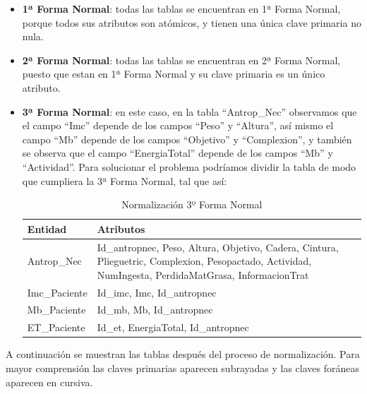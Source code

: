 \begin{itemize}
\item \textbf{1ª Forma Normal}: todas las tablas se encuentran en 1ª Forma Normal, porque todos sus atributos son atómicos, y tienen una única clave primaria no nula.
\item \textbf{2ª Forma Normal}: todas las tablas se encuentran en 2ª Forma Normal, puesto que estan en 1ª Forma Normal y su clave primaria es un único atributo.
\item \textbf{3ª Forma Normal}: en este caso, en la tabla ``Antrop\_Nec'' observamos que el campo ``Imc'' depende de los campos ``Peso'' y ``Altura'', así mismo el campo ``Mb'' depende de los campos ``Objetivo'' y ``Complexion'', y también se observa que el campo ``EnergiaTotal'' depende de los campos ``Mb'' y ``Actividad''.
Para solucionar el problema podríamos dividir la tabla de modo que cumpliera la 3ª Forma Normal, tal que así:

\begin{table}[H]
\begin{center}
  \begin{tabular}{| l | p{8cm} |}
    \hline
    Entidad & Atributos \\ \hline
	Antrop\_Nec & Id\_antropnec, Peso, Altura, Objetivo, Cadera, Cintura, Plieguetric, Complexion, Pesopactado, Actividad, NumIngesta, PerdidaMatGrasa, InformacionTrat \\ \hline
	Imc\_Paciente & Id\_imc, Imc, Id\_antropnec \\ \hline
	Mb\_Paciente & Id\_mb, Mb, Id\_antropnec \\ \hline
	ET\_Paciente & Id\_et, EnergiaTotal, Id\_antropnec \\
	\hline
  \end{tabular}
\end{center}
\caption{Normalización 3º Forma Normal}
\end{table}
\end{itemize}

A continuación se muestran las tablas después del proceso de normalización. Para mayor comprensión las claves primarias aparecen subrayadas y las claves foráneas aparecen en cursiva.

